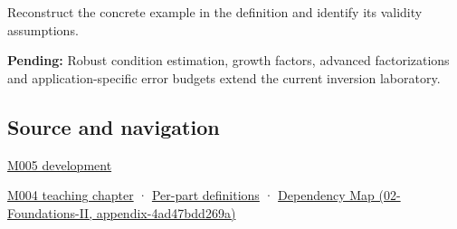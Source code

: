Reconstruct the concrete example in the definition and identify its validity assumptions.

\textbf{Pending:} Robust condition estimation, growth factors, advanced factorizations and application-specific error budgets extend the current inversion laboratory.

\subsection{Source and navigation}\label{appendix-8f6a01f284a7-source-and-navigation}

\hyperref[01-foundations-i-ch001-when-arithmetic-meets-uncertainty]{M005 development}

\hyperref[01-foundations-i-ch001-a-stretching-ruler-for-real-valued-quantities]{M004 teaching chapter} · \hyperref[appendix-fd090d982a15-m004---parts-61-76]{Per-part definitions} · \href{../02-Foundations-II/main.pdf\#nameddest=appendix-4ad47bdd269a}{Dependency Map (02-Foundations-II, appendix-4ad47bdd269a)}
